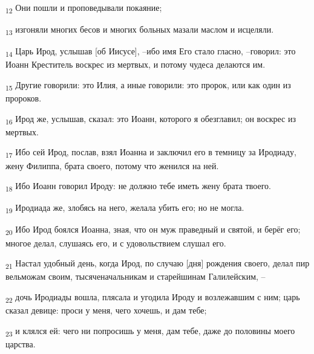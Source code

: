 \begin{tcolorbox}
\textsubscript{12} Они пошли и проповедывали покаяние;
\end{tcolorbox}
\begin{tcolorbox}
\textsubscript{13} изгоняли многих бесов и многих больных мазали маслом и исцеляли.
\end{tcolorbox}
\begin{tcolorbox}
\textsubscript{14} Царь Ирод, услышав [об Иисусе], --ибо имя Его стало гласно, --говорил: это Иоанн Креститель воскрес из мертвых, и потому чудеса делаются им.
\end{tcolorbox}
\begin{tcolorbox}
\textsubscript{15} Другие говорили: это Илия, а иные говорили: это пророк, или как один из пророков.
\end{tcolorbox}
\begin{tcolorbox}
\textsubscript{16} Ирод же, услышав, сказал: это Иоанн, которого я обезглавил; он воскрес из мертвых.
\end{tcolorbox}
\begin{tcolorbox}
\textsubscript{17} Ибо сей Ирод, послав, взял Иоанна и заключил его в темницу за Иродиаду, жену Филиппа, брата своего, потому что женился на ней.
\end{tcolorbox}
\begin{tcolorbox}
\textsubscript{18} Ибо Иоанн говорил Ироду: не должно тебе иметь жену брата твоего.
\end{tcolorbox}
\begin{tcolorbox}
\textsubscript{19} Иродиада же, злобясь на него, желала убить его; но не могла.
\end{tcolorbox}
\begin{tcolorbox}
\textsubscript{20} Ибо Ирод боялся Иоанна, зная, что он муж праведный и святой, и берёг его; многое делал, слушаясь его, и с удовольствием слушал его.
\end{tcolorbox}
\begin{tcolorbox}
\textsubscript{21} Настал удобный день, когда Ирод, по случаю [дня] рождения своего, делал пир вельможам своим, тысяченачальникам и старейшинам Галилейским, --
\end{tcolorbox}
\begin{tcolorbox}
\textsubscript{22} дочь Иродиады вошла, плясала и угодила Ироду и возлежавшим с ним; царь сказал девице: проси у меня, чего хочешь, и дам тебе;
\end{tcolorbox}
\begin{tcolorbox}
\textsubscript{23} и клялся ей: чего ни попросишь у меня, дам тебе, даже до половины моего царства.
\end{tcolorbox}
